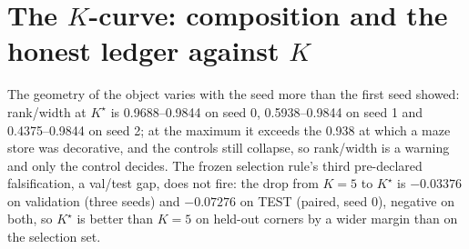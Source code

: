 \documentclass{article} %
\newcommand{\Kstar}{\ensuremath{K^{\star}}}
\begin{document}
\section{The $K$-curve: composition and the honest ledger against $K$}
\label{app:kcurve}

The geometry of the object varies with the seed more than the first seed showed:
rank/width at $\Kstar$ is 0.9688--0.9844 on seed 0, 0.5938--0.9844 on seed 1 and
0.4375--0.9844 on seed 2; at the maximum it exceeds the 0.938 at which a maze store was
decorative, and the controls still collapse, so rank/width is a warning and only the control
decides. %
The frozen selection rule's third pre-declared falsification, a val/test gap, does not fire:
the drop from $K=5$ to $\Kstar$ is $-0.03376$ on validation (three seeds) and $-0.07276$ on
TEST (paired, seed 0), negative on both, so $\Kstar$ is better than $K=5$ on held-out corners
by a wider margin than on the selection set. %
\end{document}
